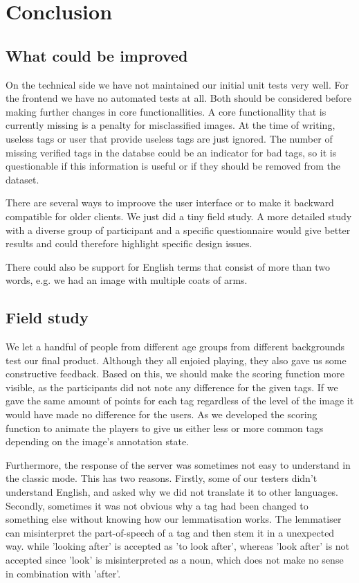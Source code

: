 \section{Conclusion}
\label{g1:sec:conclusion}

\subsection{What could be improved}
\label{g1:sec:conclusion:improved}
On the technical side we have not maintained our initial unit tests very well. For the frontend we have no automated tests at all. Both should be considered before making further changes in core functionallities.
A core functionallity that is currently missing is a penalty for misclassified images. At the time of writing, useless tags or user that provide useless tags are just ignored. The number of missing verified tags in the databse could be an indicator for bad tags, so it is questionable if this information is useful or if they should be removed from the dataset.

There are several ways to improove the user interface or to make it backward compatible for older clients. We just did a tiny field study. A more detailed study with a diverse group of participant and a specific questionnaire would give better results and could therefore highlight specific design issues.

There could also be support for English terms that consist of more than two words, e.g. we had an image with multiple coats of arms.


\subsection{Field study}
\label{g1:sec:conclusion:fieldstudy}
We let a handful of people from different age  groups from different backgrounds test our final product.
Although they all enjoied playing, they also gave us some constructive feedback.
Based on this, we should make the scoring function more visible, as the participants did not note any difference for the given tags.
If we gave the same amount of points for each tag regardless of the level of the image it would have made no difference for the users.
As we developed the scoring function to animate the players to give us either less or more common tags depending on the image's annotation state.

Furthermore, the response of the server was sometimes not easy to understand in the classic mode.
This has two reasons.
Firstly, some of our testers didn't understand English, and asked why we did not translate it to other languages. 
Secondly, sometimes it was not obvious why a tag had been changed to something else without knowing how our lemmatisation works.
The lemmatiser can misinterpret the part-of-speech of a tag and then stem it in a unexpected way.
while 'looking after' is accepted as 'to look after', whereas 'look after' is not accepted since 'look' is misinterpreted as a noun, which does not make no sense in combination with 'after'.

